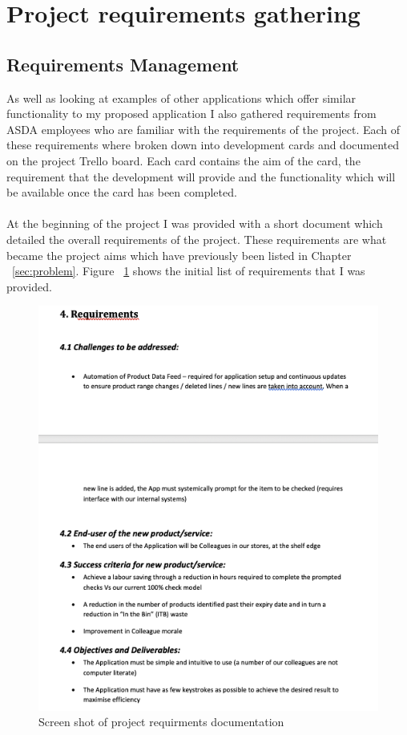 \documentclass[a4paper,11pt]{report}
\begin{document}
\section{Project requirements gathering}
\subsection{Requirements Management}

As well as looking at examples of other applications which offer similar functionality to my proposed
application I also gathered requirements from ASDA employees who are familiar with the requirements 
of the project. Each of these requirements where broken down into development cards and documented on
the project Trello board. Each card contains the aim of the card, the requirement that the development
will provide and the functionality which will be available once the card has been completed. 
\\
\\
At the beginning of the project I was provided with a short document which detailed the overall requirements of the project. These requirements are what became the project aims which have previously been listed in Chapter ~\ref{sec:problem}. Figure ~\ref{fig:project_requirements} shows the initial list of requirements that I was provided. 

\begin{figure}[H]
    \includegraphics[width=\linewidth]{./assets/images/requirements.png}
    \caption{Screen shot of project requirments documentation}
    \label{fig:project_requirements}
\end{figure}
\end{document}
